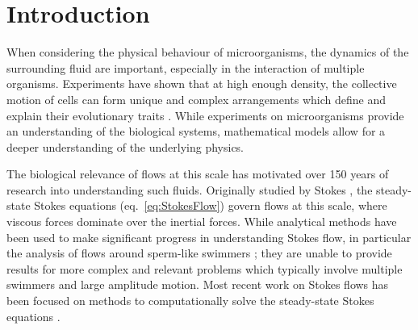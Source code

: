 \section{Introduction}
When considering the physical behaviour of microorganisms, the dynamics of the surrounding fluid are important, especially in the interaction of multiple organisms. Experiments have shown that at high enough density, the collective motion of cells can form unique and complex arrangements which define and explain their evolutionary traits \cite{Moore2002ExceptionalMouse,Cisneros2011DynamicsConcentration,Piddini2005Biophysics:Cells}. While experiments on microorganisms provide an understanding of the biological systems, mathematical models allow for a deeper understanding of the underlying physics. 

The biological relevance of flows at this scale has motivated over 150 years of research into understanding such fluids. Originally studied by Stokes \cite{Stokes2010OnPendulums}, the steady-state Stokes equations (eq.~\ref{eq:StokesFlow}) govern flows at this scale, where viscous forces dominate over the inertial forces. While analytical methods have been used to make significant progress in understanding Stokes flow, in particular the analysis of flows around sperm-like swimmers \cite{Hancock1953TheLiquids,GRAY1955TheSpermatozoa,Taylor1951AnalysisOrganisms}; they are unable to provide results for more complex and relevant problems which typically involve multiple swimmers and large amplitude motion. Most recent work on Stokes flows has been focused on methods to computationally solve the steady-state Stokes equations \cite{Biros2003,Rostami2016Kernel-independentStokeslets,Rostami2019FastBiofluids,Wang2006AlgorithmsSimulation,Sierou2001AcceleratedSimulations,Selmi2007FastComplexity,Smith2018AEquation,Gallagher2020}. 

